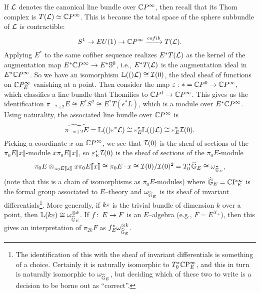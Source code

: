 \begin{example}
If $\mathcal{L}$ denotes the canonical line bundle over $\mathbb{C} P^\infty$, then recall that its Thom complex is $T(\mathcal{L}) \simeq \mathbb{C} P^\infty$.  This is because the total space of the sphere subbundle of $\mathcal{L}$ is contractible: \[ S^1 \rightarrow EU(1) \rightarrow \mathbb{C} P^\infty \xrightarrow{cofib} T(\mathcal{L}). \]  Applying $E^*$ to the same cofiber sequence realizes $E^* T(\mathcal{L})$ as the kernel of the augmentation map $E^* \mathbb{C} P^\infty \to E^* \mathbb S^0$, i.e., $E^* T(\mathcal{L})$ is the augmentation ideal in $E^* \mathbb{C} P^\infty$.  So we have an isomorphism $\mathbb{L}(()\mathcal{L}) \cong \mathcal{I} (0)$, the ideal sheaf of functions on $\mathbb{C} P^\infty_E$ vanishing at a point.  Then consider the map $\varepsilon: * = \mathbb{C} P^0 \to \mathbb{C} P^\infty$, which classifies a line bundle that Thomifies to $\mathbb{C} P^1 \to \mathbb{C} P^\infty$.  This gives us the identification $\pi_{-*+2} E \cong E^* S^2 \cong E^* T(\epsilon^* L)$, which is a module over $E^* \mathbb{C} P^\infty$.  Using naturality, the associated line bundle over $\mathbb{C} P^\infty$ is \[\widetilde{\pi_{-*+2} E} = \mathbb{L}(()\varepsilon^* \mathcal{L}) \cong \varepsilon_E^* \mathbb{L}(()\mathcal{L}) \cong \varepsilon_E^* \mathcal{I} (0).\] Picking a coordinate $x$ on $\mathbb{C} P^\infty$, we see that $\mathcal{I}(0)$ is the sheaf of sections of the $\pi_0 E \llbracket x \rrbracket$-module $x \pi_0 E \llbracket x \rrbracket$, so $\varepsilon_E^* \mathcal{I}(0)$ is the sheaf of sections of the $\pi_0 E$-module \[\pi_0 E \otimes_{\pi_0 E \llbracket x \rrbracket} x \pi_0 E \llbracket x \rrbracket \cong \pi_0 E \cdot x \cong \mathcal{I}(0)/\mathcal{I}(0)^2 = T_0^* \widehat{\mathbb G}_E \cong \omega_{\widehat{\mathbb G}_E}, \] (note that this is a chain of isomorphisms as $\pi_0 E$-modules) where $\widehat{\mathbb G}_E = \mathbb{C}\mathrm P^\infty_E$ is the formal group associated to $E$--theory and $\omega_{\widehat{\mathbb G}_E}$ is its sheaf of invariant differentials\footnote{The identification of this with the sheaf of invariant differentials is something of a choice.  Certainly it is naturally isomorphic to $T_0^* \mathbb{C}\mathrm P^\infty_E$, and this in turn is naturally isomorphic to $\omega_{\widehat{\mathbb G}_E}$, but deciding which of these two to write is a decision to be borne out as ``correct''.}.  More generally, if $k \varepsilon$  is the trivial bundle of dimension $k$ over a point, then $\mathbb{L}(k \varepsilon) \cong \omega_{\widehat{\mathbb G}_E}^{\otimes k}$.  If $f \colon\thinspace E \to F$ is an $E$--algebra (e.g., $F = E^{X_+}$), then this gives an interpretation of $\pi_{2k} F$ as $f_E^* \omega_{\widehat{\mathbb G}_E}^{\otimes k}$.
\end{example}

